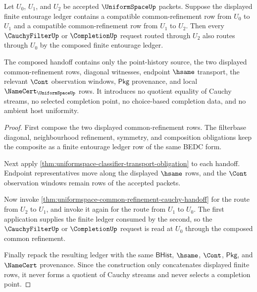 \begin{theorem}
\label{thm:uniformspace-cauchy-completion-common-refinement-functoriality}
Let $U_0$, $U_1$, and $U_2$ be accepted $\UniformSpaceUp$ packets. Suppose the
displayed finite entourage ledger contains a compatible common-refinement row
from $U_0$ to $U_1$ and a compatible common-refinement row from $U_1$ to $U_2$.
Then every $\CauchyFilterUp$ or $\CompletionUp$ request routed through $U_2$
also routes through $U_0$ by the composed finite entourage ledger.

The composed handoff contains only the point-history source, the two displayed
common-refinement rows, diagonal witnesses, endpoint $\hsame$ transport,
the relevant $\Cont$ observation windows, $\mathsf{Pkg}$ provenance, and local
$\NameCert_{\UniformSpaceUp}$ rows. It introduces no quotient equality of
Cauchy streams, no selected completion point, no choice-based completion data,
and no ambient host uniformity.
\end{theorem}
\begin{proof}
First compose the two displayed common-refinement rows. The filterbase
diagonal, neighbourhood refinement, symmetry, and composition obligations keep
the composite as a finite entourage ledger row of the same BEDC form.

Next apply \autoref{thm:uniformspace-classifier-transport-obligation} to each
handoff. Endpoint representatives move along the displayed $\hsame$ rows, and
the $\Cont$ observation windows remain rows of the accepted packets.

Now invoke
\autoref{thm:uniformspace-common-refinement-cauchy-handoff} for the route from
$U_2$ to $U_1$, and invoke it again for the route from $U_1$ to $U_0$. The first
application supplies the finite ledger consumed by the second, so the
$\CauchyFilterUp$ or $\CompletionUp$ request is read at $U_0$ through the
composed common refinement.

Finally repack the resulting ledger with the same $\mathsf{BHist}$, $\hsame$,
$\Cont$, $\mathsf{Pkg}$, and $\NameCert$ provenance. Since the construction
only concatenates displayed finite rows, it never forms a quotient of Cauchy
streams and never selects a completion point.
\end{proof}


